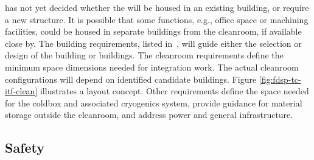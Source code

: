 \label{sec:fdsp-tc-itf-req}
 has not yet decided whether the  will be housed in an existing building, or require a new structure. It is possible that some functions, e.g., office space or machining facilities, could be housed in separate buildings from the cleanroom, if available close by. The  building requirements, listed in~\cite{bib:docdb11500}, will guide either the selection or design of the  building or buildings. 
The cleanroom requirements define the minimum space dimensions needed for integration work.  The actual cleanroom configurations will depend on identified candidate buildings.  Figure \ref{fig:fdsp-tc-itf-clean} illustrates a layout concept. Other requirements define the space needed for the coldbox and  associated cryogenics system, provide guidance for material storage outside the cleanroom, and address  power and general infrastructure. 
 
\subsection{Safety}
\label{sec:fdsp-tc-itf-safety}

